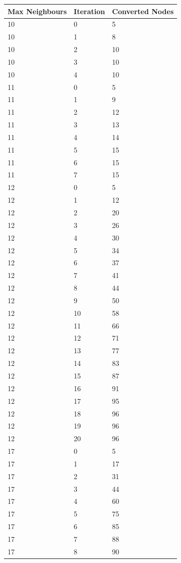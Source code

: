 \begin{table}
\centering
\begin{tabular}{|l|l|l|}
\hline
Max Neighbours & Iteration & Converted Nodes \\
\hline
10 & 0 & 5 \\
10 & 1 & 8 \\
10 & 2 & 10 \\
10 & 3 & 10 \\
10 & 4 & 10 \\
\hline
11 & 0 & 5 \\
11 & 1 & 9 \\
11 & 2 & 12 \\
11 & 3 & 13 \\
11 & 4 & 14 \\
11 & 5 & 15 \\
11 & 6 & 15 \\
11 & 7 & 15 \\
\hline
12 & 0 & 5 \\
12 & 1 & 12 \\
12 & 2 & 20 \\
12 & 3 & 26 \\ 
12 & 4 & 30 \\
12 & 5 & 34 \\
12 & 6 & 37 \\
12 & 7 & 41 \\
12 & 8 & 44 \\
12 & 9 & 50 \\
12 & 10 & 58 \\
12 & 11 & 66 \\
12 & 12 & 71 \\
12 & 13 & 77 \\
12 & 14 & 83 \\
12 & 15 & 87 \\
12 & 16 & 91 \\
12 & 17 & 95 \\
12 & 18 & 96 \\
12 & 19 & 96 \\
12 & 20 & 96 \\
\hline
17 & 0 & 5 \\
17 & 1 & 17 \\
17 & 2 & 31 \\
17 & 3 & 44 \\
17 & 4 & 60 \\
17 & 5 & 75 \\
17 & 6 & 85 \\
17 & 7 & 88 \\
17 & 8 & 90 \\

\end{tabular}
\end{table}
